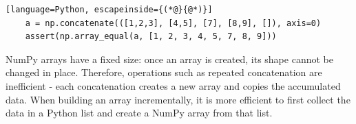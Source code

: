 \documentclass[12pt]{article}
\newcommand{\vsp}{\vspace*{8pt}}
\begin{document}
\vsp\begin{lstlisting}[language=Python, escapeinside={(*@}{@*)}]
    a = np.concatenate(([1,2,3], [4,5], [7], [8,9], []), axis=0)
    assert(np.array_equal(a, [1, 2, 3, 4, 5, 7, 8, 9]))
\end{lstlisting}

\begin{tcolorbox}[
    colframe=brickred,
    colback=white,
    title=Efficiency Note,
    fonttitle=\bfseries
]
NumPy arrays have a fixed size: once an array is created, its shape cannot be
changed in place. Therefore, operations such as repeated
concatenation are inefficient - each concatenation creates a new array and
copies the accumulated data. When building an array incrementally, it is
more efficient to first collect the data in a Python list and create a
NumPy array from that list.
\end{tcolorbox}
\end{document}

